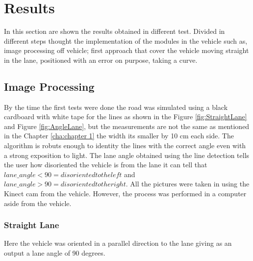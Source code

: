 \chapter{Results}
\label{cha:chapter4}
In this section are shown the results obtained in different test. Divided in different steps thought the implementation of the modules in the vehicle such as, image processing off vehicle; first approach that cover the vehicle moving straight in the lane, positioned with an error on purpose, taking a curve. 

\section{Image Processing}
By the time the first tests were done the road was simulated using a black cardboard with white tape for the lines as shown in the Figure \ref{fig:StraightLane} and Figure \ref{fig:AngleLane}, but the measurements are not the same as mentioned in the Chapter \ref{cha:chapter 1} the width its smaller by 10 cm each side. The algorithm is robuts enough to identity the lines with the correct angle even with a strong exposition to light. The lane angle obtained using the line detection tells the user how disoriented the vehicle is from the lane it can tell that $lane\_angle<90 = disoriented to the left$ and $lane\_angle>90 = disoriented to the right$.
All the pictures were taken in using the Kinect cam from the vehicle. However, the process was performed in a computer aside from the vehicle.

    \subsection{Straight Lane}
    Here the vehicle was oriented in a parallel direction to the lane giving as an output a lane angle of 90 degrees.
    
